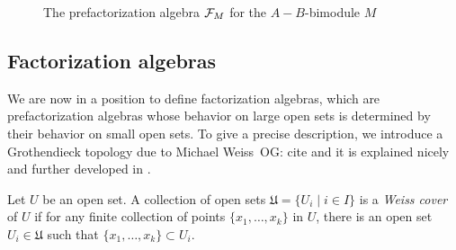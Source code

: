 \documentclass[11pt]{amsart}
\def\owen#1{{\textcolor{violet!65!black}{OG: {#1}}}}
\begin{document}
\begin{figure}
\begin{center}
\end{center}
\caption{The prefactorization algebra $\mathcal F_M$ for the $A-B$-bimodule $M$}
\label{fig:bimodasfact}
\end{figure}

\subsection{Factorization algebras}

We are now in a position to define factorization algebras,
which are prefactorization algebras whose behavior on large open sets is determined by their behavior on small open sets.
To give a precise description, we introduce a Grothendieck topology due to Michael Weiss~\owen{cite  \cite{Weiss} and it is explained nicely and further developed in \cite{BoavidaWeiss}}.

\begin{dfn}
Let $U$ be an open set. A collection of open sets $\mathfrak{U} = \{ U_i \mid i \in I\}$ is a {\em Weiss cover} of $U$ if for any finite collection of points $\{x_1,\ldots,x_k\}$ in $U$, there is an open set $U_i \in \mathfrak{U}$ such that $\{x_1,\ldots,x_k\} \subset U_i$.
\end{dfn}
\end{document}

